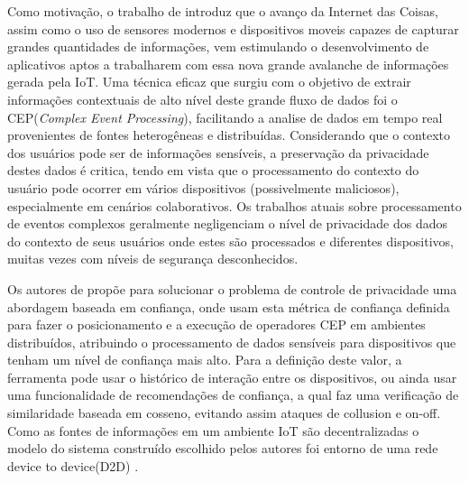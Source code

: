 \documentclass[ti,table]{texufpel} %
\begin{document}
	Como motivação, o trabalho de \cite{art6dwarakanath2017trustcep} introduz que o avanço da Internet das Coisas, assim como o uso de sensores modernos e dispositivos moveis capazes de capturar grandes quantidades de informações, vem estimulando o desenvolvimento de aplicativos aptos a trabalharem com essa nova grande avalanche de informações gerada pela IoT. Uma técnica eficaz que surgiu com o objetivo de extrair informações contextuais de alto nível deste grande fluxo de dados foi o CEP(\textit{Complex Event Processing}), facilitando a analise de dados em tempo real provenientes de fontes heterogêneas e distribuídas. Considerando que o contexto dos usuários pode ser de informações sensíveis, a preservação da privacidade destes dados é critica, tendo em vista que o processamento do contexto do usuário pode ocorrer em vários dispositivos (possivelmente maliciosos), especialmente em cenários colaborativos. Os trabalhos atuais sobre processamento de eventos complexos geralmente negligenciam o nível de privacidade dos dados do contexto de seus usuários onde estes são processados e diferentes dispositivos, muitas vezes com níveis de segurança desconhecidos. 
	
	
	Os autores de \cite{art6dwarakanath2017trustcep} propõe para solucionar o problema de controle de privacidade uma abordagem baseada em confiança, onde usam esta métrica de confiança definida para fazer o posicionamento e a execução de operadores CEP em ambientes distribuídos, atribuindo o processamento de dados sensíveis para dispositivos que tenham um nível de confiança mais alto. Para a definição deste valor, a ferramenta pode usar o histórico de interação entre os dispositivos, ou ainda usar uma funcionalidade de recomendações de confiança, a qual faz uma verificação de similaridade baseada em cosseno, evitando assim ataques de collusion e on-off. Como as fontes de informações em um ambiente IoT são decentralizadas o modelo do sistema construído escolhido pelos autores foi entorno de uma rede device to device(D2D) .
	
\end{document}
